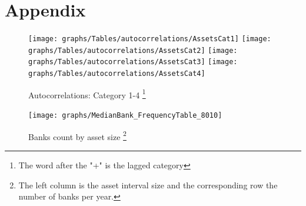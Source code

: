 \documentclass[12pt, a4paper]{article} %
\begin{document}
\newpage
\printbibliography[
heading=bibintoc,
title={Bibliography}
]

 




\appendix
\section{Appendix}

\begin{figure}[hbtp]
\begin{minipage}{\textwidth}
\centering
\caption[1]{Autocorrelations: Category 1-4 \footnote{The word after the "+" is the lagged category}}
\texttt{[image: graphs/Tables/autocorrelations/AssetsCat1]}
\texttt{[image: graphs/Tables/autocorrelations/AssetsCat2]}
\texttt{[image: graphs/Tables/autocorrelations/AssetsCat3]}
\texttt{[image: graphs/Tables/autocorrelations/AssetsCat4]}
\label{autocorrelationsCat14}
\end{minipage}
\end{figure}




\begin{figure}[hbtp]
\begin{minipage}{\textwidth}
\centering
\caption[1]{Banks count by asset size \footnote{The left column is the asset interval size and the corresponding row the number of banks per year.}}
\texttt{[image: graphs/MedianBank\_FrequencyTable\_8010]}
\end{minipage}
\end{figure}
\end{document}
